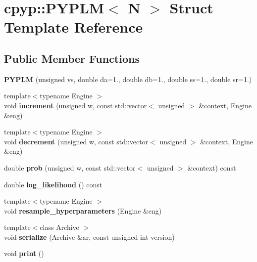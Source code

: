 \hypertarget{structcpyp_1_1_p_y_p_l_m}{}\section{cpyp\+:\+:P\+Y\+P\+LM$<$ N $>$ Struct Template Reference}
\label{structcpyp_1_1_p_y_p_l_m}
\subsection*{Public Member Functions}
\begin{DoxyCompactItemize}
\item 
\mbox{\label{structcpyp_1_1_p_y_p_l_m_af6ad8b19e6a37aa0abc885787e33e649}} 
{\bfseries P\+Y\+P\+LM} (unsigned vs, double da=1., double db=1., double ss=1., double sr=1.)
\item 
\mbox{\label{structcpyp_1_1_p_y_p_l_m_ab05d9800e3e62c87bb35bf5d8b4e3d67}} 
{\footnotesize template$<$typename Engine $>$ }\\void {\bfseries increment} (unsigned w, const std\+::vector$<$ unsigned $>$ \&context, Engine \&eng)
\item 
\mbox{\label{structcpyp_1_1_p_y_p_l_m_af2a057a5d2d4ba6389e6fd9ef0756594}} 
{\footnotesize template$<$typename Engine $>$ }\\void {\bfseries decrement} (unsigned w, const std\+::vector$<$ unsigned $>$ \&context, Engine \&eng)
\item 
\mbox{\label{structcpyp_1_1_p_y_p_l_m_ace332fabe9addb79cc5e68d6ab1884f5}} 
double {\bfseries prob} (unsigned w, const std\+::vector$<$ unsigned $>$ \&context) const
\item 
\mbox{\label{structcpyp_1_1_p_y_p_l_m_a1ce518c3aa817de05fd9259ba6e5b9da}} 
double {\bfseries log\+\_\+likelihood} () const
\item 
\mbox{\label{structcpyp_1_1_p_y_p_l_m_a16776e9406d8a810cce71d9602aa139d}} 
{\footnotesize template$<$typename Engine $>$ }\\void {\bfseries resample\+\_\+hyperparameters} (Engine \&eng)
\item 
\mbox{\label{structcpyp_1_1_p_y_p_l_m_a4fcee24f5150d8c4955f15e32f5992a0}} 
{\footnotesize template$<$class Archive $>$ }\\void {\bfseries serialize} (Archive \&ar, const unsigned int version)
\item 
\mbox{\label{structcpyp_1_1_p_y_p_l_m_a4543a079fb8612bd2dc8ec7e3e47ce1b}} 
void {\bfseries print} ()
\end{DoxyCompactItemize}
